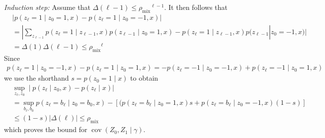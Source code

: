 \documentclass[twoside,11pt]{article}
\DeclareMathOperator{\cov}{cov}
\newcommand{\mixcoef}{\ensuremath{\rho_{\mathrm{mix}}}}
\newcommand{\paramgamma}{\gamma}
\newcommand{\condcov}[3]{\cov(#1, #2 \mid #3)}
\begin{document}
\emph{Induction step:} Assume that $\Delta(\ell-1) \leq \mixcoef^{\ell-1}$.  
It then follows that
\begin{align*}
&|p(z_{\ell}=1 \mid z_0=1,x) - p(z_{\ell}=1 \mid z_0=-1,x)| \\ 
%
& = |\sum_{z_{\ell-1}} p(z_{\ell}
  =1 \mid z_{\ell-1},x)p(z_{\ell-1} \mid z_0=1,x) - 
  p(z_{\ell}=1 \mid z_{\ell-1},x)p(z_{\ell-1}|z_0
  =-1,x)| \\ 
%
&= \Delta(1) \Delta(\ell-1) \leq \mixcoef^{\ell}
%
\end{align*}
Since 
\begin{align*}
p(z_{\ell} = 1 \mid z_{0}= -1,x) - p(z_{\ell}=1 \mid z_{0}=
  1,x) = - p(z_{\ell} = -1 \mid z_{0}= -1,x) + p(z_{\ell}= -1 \mid z_{0}=
  1,x)
\end{align*}
we use the shorthand $s = p(z_0 = 1 \mid x)$ to obtain
\begin{align*}
&\sup_{z_{\ell},z_{0}} \mid p(z_{\ell} \mid z_{0},x) - p(z_{\ell} \mid x)| \\
%
& = \sup_{b_{\ell},b_{0}} p(z_{\ell}=b_{\ell} \mid z_{0}=b_{0},x) -
  [(p(z_{\ell}=b_{\ell} \mid z_{0}=1,x)s +
    p(z_{\ell}=b_{\ell} \mid z_{0}=-1,x)(1-s)] \\ 
%
%
&\leq (1-s) |\Delta(\ell)| \leq \mixcoef
%
\end{align*}
which proves the bound for $\condcov{Z_0}{Z_1}{\paramgamma}$.
\end{document}

